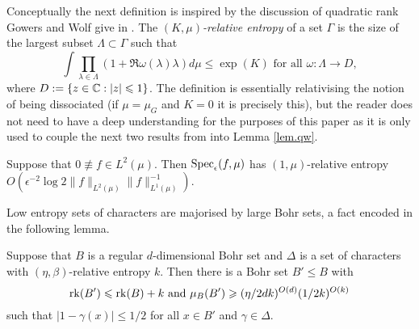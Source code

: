 \documentclass[12pt]{amsart}  %
\begin{document}
Conceptually the next definition is inspired by the discussion of quadratic rank Gowers and Wolf give in \cite{gowwol::}.  The \emph{$(K,\mu)$-relative entropy} of a set $\Gamma$ is the size of the largest subset $\Lambda\subset \Gamma$ such that
\begin{equation*}
\int{\prod_{\lambda \in \Lambda}{(1+\Re \omega(\lambda)\lambda)}d\mu} \leq \exp(K)  \textrm{ for all } \omega:\Lambda \rightarrow D,
\end{equation*}
where $D:=\{z \in \mathbb{C}:|z|\leqslant 1\}$.  The definition is essentially relativising the notion of being dissociated (if $\mu=\mu_G$ and $K=0$ it is precisely this), but the reader does not need to have a deep understanding for the purposes of this paper as it is only used to couple the next two results from \cite{san::01} into Lemma \ref{lem.qw}.  
\begin{lemma}\label{lem.changbd}  Suppose that $0 \not \equiv f \in L^2(\mu)$.  Then $\mathop{\rm Spec}\nolimits_\epsilon(f,\mu)$ has $(1,\mu)$-relative entropy $O( \epsilon^{-2}\log 2\|f\|_{L^2(\mu)}\|f\|_{L^1(\mu)}^{-1})$.
\end{lemma}
Low entropy sets of characters are majorised by large Bohr sets, a fact encoded in the following lemma.
\begin{lemma}\label{lem.dis}
Suppose that $B$ is a regular $d$-dimensional Bohr set and $\Delta$ is a set of characters with $(\eta,\beta)$-relative entropy $k$.  Then there is a Bohr set $B' \leq B$ with
\begin{equation*}
\mathop{\rm rk}\nolimits(B') \leqslant \mathop{\rm rk}\nolimits(B)+k \textrm{ and } \mu_{B}(B') \geqslant (\eta/2dk)^{O(d)}(1/2k)^{O(k)}
\end{equation*}
such that $|1-\gamma(x)| \leq 1/2$ for all $x \in B'$ and $\gamma \in \Delta$.
\end{lemma}
\end{document}
